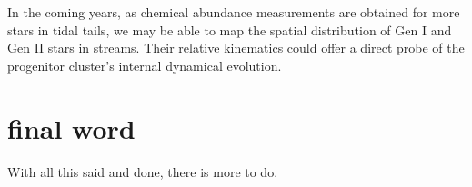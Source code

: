         In the coming years, as chemical abundance measurements are obtained for more stars in tidal tails, we may be able to map the spatial distribution of Gen I and Gen II stars in streams. Their relative kinematics could offer a direct probe of the progenitor cluster's internal dynamical evolution.

\section{final word}
    With all this said and done, there is more to do. 
